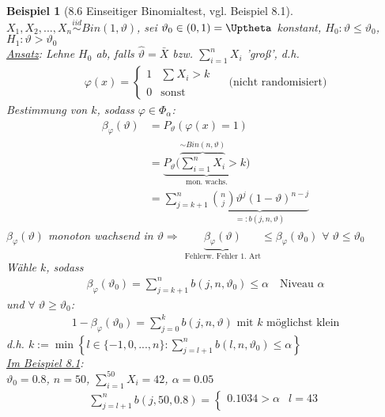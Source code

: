 \documentclass[a4paper,openany]{book}
\theoremstyle{mytheoremstyle}
\newtheorem*{bei}{Beispiel}
\theoremstyle{mytheoremstyle2}
\begin{document}
\begin{bei}[8.6 Einseitiger Binomialtest, vgl. Beispiel 8.1]
  $X_1,X_2,...,X_n \overset{iid}\sim Bin(1,\vartheta )$, sei $\vartheta _0 \in (0,1)=\Uptheta$ konstant, $H_0:\vartheta \leq \vartheta _0$, $H_1:\vartheta >\vartheta _0$  \\
\underline{Ansatz}: Lehne $H_0$ ab, falls $\hat{\vartheta }=\bar{X}$ bzw. $\sum_{i=1}^{n}{X_i}$ 'groß', d.h. 
  \begin{align*}
    \varphi (x)=\begin{cases}
      1 &\sum_{}^{}{X_i}>k\\
      0& \text{sonst}
    \end{cases}\quad\text{ (nicht randomisiert)}
  \end{align*}
   Bestimmung von $k$, sodass $\varphi \in \Phi _{\alpha }$:
  \begin{align*}
    \beta _{\varphi }(\vartheta )
    &=P _{\vartheta }(\varphi (x)=1)\\
    &=\underbrace{P _{\vartheta }\bigg({\overbrace{\sum_{i=1}^{n}X_i}^{\sim Bin(n,\vartheta )} }>k\bigg)}_{\text{mon. wachs.}}\\
    &=\sum_{j=k+1}^{n}{\underbrace{\binom{n}{j}\vartheta ^j(1-\vartheta )^{n-j}}_{=:b(j,n,\vartheta )}}
  \end{align*}
  $\beta _{\varphi }(\vartheta )$ monoton wachsend in $\vartheta \Rightarrow $ $\underbrace{\beta _{\varphi }(\vartheta )}_{\text{Fehlerw. Fehler 1. Art}}\leq \beta _{\varphi }(\vartheta _0)$ $\forall\;\vartheta \leq \vartheta _0$  \\
  Wähle $k$, sodass
  \begin{align*}
    \beta _{\varphi }(\vartheta _0)=\sum_{j=k+1}^{n}{b(j,n,\vartheta _0)}\leq \alpha \quad \text{Niveau $\alpha $}
  \end{align*}
  und $\forall\;\vartheta \geq \vartheta _0$:
  \begin{align*}
    1-\beta _{\varphi }(\vartheta _0)=\sum_{j=0}^{k}{b(j,n,\vartheta )}\text{ mit $k$ möglichst klein}
  \end{align*}
d.h. $k:=\min \left\{l \in \{-1,0,...,n\}:\sum_{j=l+1}^{n}{b(l,n,\vartheta_0 )}\leq \alpha \right\}$ \\
\underline{Im Beispiel 8.1}: \\
$\vartheta _0=0.8$, $n=50$, $\sum_{i=1}^{50}{X_i}=42$, $\alpha =0.05$    
\begin{align*}
  \sum_{j=l+1}^{n}{b(j,50,0.8)}=\begin{cases}
    0.1034>\alpha  &l=43\\

\end{cases}
\end{align*}
\end{bei}
\end{document}
